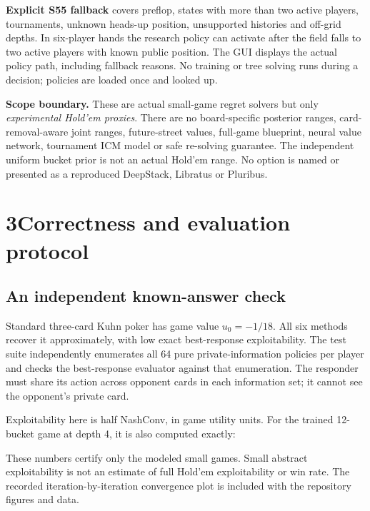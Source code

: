 \documentclass[10pt,letterpaper]{article}
\begin{document}
\textbf{Explicit S55 fallback} covers preflop, states with more than two active
players, tournaments, unknown heads-up position, unsupported histories and
off-grid depths. In six-player hands the research policy can activate after
the field falls to two active players with known public position. The GUI
displays the actual policy path, including fallback reasons. No training or
tree solving runs during a decision; policies are loaded once and looked up.

\textbf{Scope boundary.} These are actual small-game regret solvers but only
\emph{experimental Hold'em proxies}. There are no board-specific posterior
ranges, card-removal-aware joint ranges, future-street values, full-game
blueprint, neural value network, tournament ICM model or safe re-solving
guarantee. The independent uniform bucket prior is not an actual Hold'em range.
No option is named or presented as a reproduced DeepStack, Libratus or Pluribus.

\newpage
\section*{3\quad Correctness and evaluation protocol}
\subsection*{An independent known-answer check}
Standard three-card Kuhn poker has game value $u_0=-1/18$. All six methods
recover it approximately, with low exact best-response exploitability. The
test suite independently enumerates all 64 pure private-information policies
per player and checks the best-response evaluator against that enumeration.
The responder must share its action across opponent cards in each information
set; it cannot see the opponent's private card.

\begin{center}\small\end{center}
Exploitability here is half NashConv, in game utility units. For the trained
12-bucket game at depth 4, it is also computed exactly:
\begin{center}\small\end{center}
These numbers certify only the modeled small games. Small abstract
exploitability is not an estimate of full Hold'em exploitability or win rate.
The recorded iteration-by-iteration convergence plot is included with the
repository figures and data.
\end{document}
